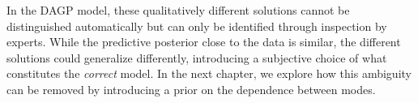 In the DAGP model, these qualitatively different solutions cannot be distinguished automatically but can only be identified through inspection by experts.
While the predictive posterior close to the data is similar, the different solutions could generalize differently, introducing a subjective choice of what constitutes the \emph{correct} model.
In the next chapter, we explore how this ambiguity can be removed by introducing a prior on the dependence between modes.
